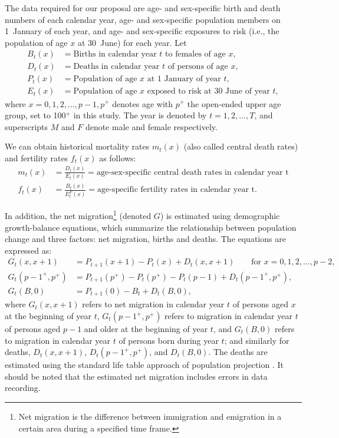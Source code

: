 \documentclass[
  doublespace]{anzsauth}
\begin{document}
The data required for our proposal are age- and sex-specific birth and death numbers of each calendar year, age- and sex-specific population members on 1~January of each year, and age- and sex-specific exposures to risk (i.e., the population of age \(x\) at 30~June) for each year. Let
\begin{align*}
  B_t(x) &= \text{Births in calendar year $t$ to females of age $x$},\\
  D_t(x) &= \text{Deaths in calendar year $t$ of persons of age $x$},\\
  P_t(x) &= \text{Population of age $x$ at 1 January of year $t$},\\
  E_t(x) &= \text{Population of age $x$ exposed to risk at 30 June of year $t$},
\end{align*}
where \(x=0,1,2,\dots,p-1,p^+\) denotes age with \(p^+\) the open-ended upper age group, set to 100\(^+\) in this study. The year is denoted by \(t=1,2,\dots,T\), and superscripts \(M\) and \(F\) denote male and female respectively.

We can obtain historical mortality rates \(m_t(x)\) (also called central death rates) and fertility rates \(f_t(x)\) as follows:
\begin{align*}
  m_t(x) & = \frac{D_t(x)}{E_t(x)}=\text{age-sex-specific central death rates in calendar year t}\\
  f_t(x) & = \frac{B_t(x)}{E^F_t(x)}=\text{age-specific fertility rates in calendar year t}.
\end{align*}

In addition, the net migration\footnote{Net migration is the difference between immigration and emigration in a certain area during a specified time frame.} (denoted \(G\)) is estimated using demographic growth-balance equations, which summarize the relationship between population change and three factors: net migration, births and deaths. The equations are expressed as:
\begin{align*}
  G_t(x,x+1)     & =P_{t+1}(x+1)-P_t(x)+D_t(x,x+1)\qquad\text{for $x=0,1,2,\dots,p-2$},\\
  G_t(p-1^+,p^+) & =P_{t+1}(p^+)-P_t(p^+)-P_t(p-1)+D_t(p-1^+,p^+),\\
  G_t(B,0)       & =P_{t+1}(0)-B_t+D_t(B,0),
\end{align*}
where \(G_t(x,x+1)\) refers to net migration in calendar year \(t\) of persons aged \(x\) at the beginning of year \(t\), \(G_t(p-1^+,p^+)\) refers to migration in calendar year \(t\) of persons aged \(p-1\) and older at the beginning of year \(t\), and \(G_t(B,0)\) refers to migration in calendar year \(t\) of persons born during year \(t\); and similarly for deaths, \(D_t(x,x+1)\), \(D_t(p-1^+,p^+)\), and \(D_t(B,0)\). The deaths are estimated using the standard life table approach of population projection \citep{Preston2000}. It should be noted that the estimated net migration includes errors in data recording.
\end{document}
